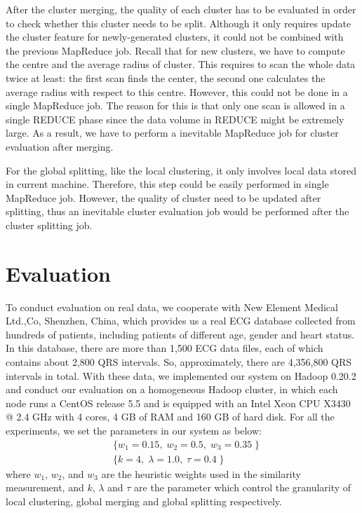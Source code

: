 \documentclass[conference]{IEEEtran}
\begin{document}
After the cluster merging, the quality of each cluster has to be evaluated in order to check whether this cluster needs to be split. Although it only requires update the cluster feature for newly-generated clusters, it could not be combined with the previous MapReduce job. Recall that for new clusters, we have to compute the centre and the average radius of cluster. This requires to scan the whole data twice at least: the first scan finds the center, the second one calculates the average radius with respect to this centre. However, this could not be done in a single MapReduce job. The reason for this is that only one scan is allowed in a single REDUCE phase since the data volume in REDUCE might be extremely large. As a result, we have to perform a inevitable MapReduce job for cluster evaluation after merging.


For the global splitting, like the local clustering, it only involves local data stored in current machine. Therefore, this step could be easily performed in single MapReduce job. However, the quality of cluster need to be updated after splitting, thus an inevitable cluster evaluation job would be performed after the cluster splitting job.

\section{Evaluation}
To conduct evaluation on real data, we cooperate with New Element Medical Ltd.,Co, Shenzhen, China, which provides us a real ECG database collected from hundreds of patients, including patients of different age, gender and heart status. In this database, there are more than 1,500 ECG data files, each of which contains about 2,800 QRS intervals. So, approximately, there are 4,356,800 QRS intervals in total. With these data, we implemented our system on Hadoop 0.20.2 and conduct our evaluation on a homogeneous Hadoop cluster, in which each node runs a CentOS release 5.5 and is equipped with an Intel Xeon CPU X3430 @ 2.4 GHz with 4 cores, 4 GB of RAM and 160 GB of hard disk. For all the experiments, we set the parameters in our system as below:
\begin{equation}
\begin{aligned}
& \{ w_1=0.15, \; w_2=0.5, \; w_3=0.35 \;  \}\\
& \{ k=4, \; \lambda=1.0, \; \tau=0.4 \;  \} 
\end{aligned}
\end{equation}
where  $ w_1 $, $ w_2 $, and $ w_3 $ are the heuristic weights used in the similarity measurement, and $ k $, $ \lambda $ and $ \tau $ are the parameter which control the granularity of local clustering, global merging and global splitting respectively.
\end{document}
